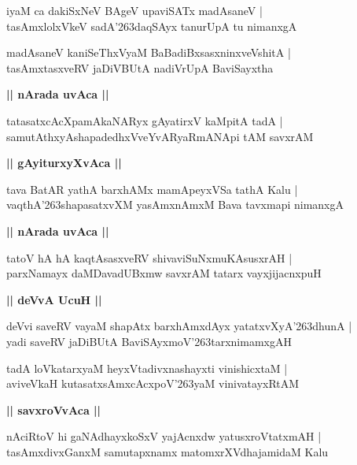 \documentclass[twoside,12pt,openright]{book}
\def\S{\char'263}
\newcounter{shloka}[chapter]
\def\uvaca#1{\centerline{{\large\textbf{#1}}}}
\begin{document}
\begin{shloka}%
iyaM ca dakiSxNeV BAgeV upaviSATx madAsaneV |\\
tasAmxlolxVkeV sadA\S daqSAyx tanurUpA tu nimanxgA 
\end{shloka}

\begin{shloka}%
madAsaneV kaniSeThxVyaM BaBadiBxsasxninxveVshitA |\\
tasAmxtasxveRV jaDiVBUtA nadiVrUpA BaviSayxtha 
\end{shloka}

\uvaca{|| nArada uvAca ||}

\begin{shloka}%
tatasatxcAcXpamAkaNARyx gAyatirxV kaMpitA tadA |\\
samutAthxyAshapadedhxVveYvARyaRmANApi tAM savxrAM 
\end{shloka}

\uvaca{|| gAyiturxyXvAca ||}

\begin{shloka}%
tava BatAR yathA barxhAMx mamApeyxVSa tathA Kalu |\\
vaqthA\S shapasatxvXM yasAmxnAmxM Bava tavxmapi nimanxgA 
\end{shloka}

\uvaca{|| nArada uvAca ||}

\begin{shloka}%
tatoV hA hA kaqtAsasxveRV shivaviSuNxmuKAsusxrAH |\\
parxNamayx daMDavadUBxmw savxrAM tatarx vayxjijacnxpuH 
\end{shloka}

\uvaca{|| deVvA UcuH ||}

\begin{shloka}%
deVvi saveRV vayaM shapAtx barxhAmxdAyx yatatxvXyA\S dhunA |\\
yadi saveRV jaDiBUtA BaviSAyxmoV\S tarxnimamxgAH 
\end{shloka}

\begin{shloka}%
tadA loVkatarxyaM heyxVtadivxnashayxti vinishicxtaM |\\
aviveVkaH kutasatxsAmxcAcxpoV\S yaM vinivatayxRtAM 
\end{shloka}

\uvaca{|| savxroVvAca ||}

\begin{shloka}%
nAciRtoV hi gaNAdhayxkoSxV yajAcnxdw yatusxroVtatxmAH |\\
tasAmxdivxGanxM samutapxnamx matomxrXVdhajamidaM Kalu
\end{shloka}
\end{document}

